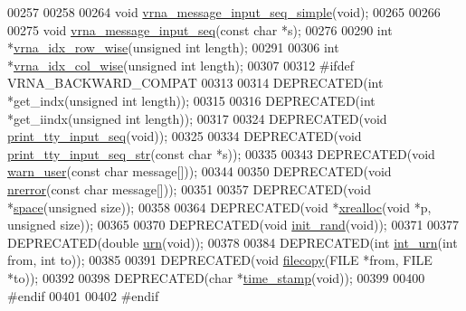 \begin{DoxyCode}
00257 
00258 
00264 \textcolor{keywordtype}{void} \hyperlink{group__utils_gaee1dd652ca5b9e56b096963a1576f73b}{vrna\_message\_input\_seq\_simple}(\textcolor{keywordtype}{void});
00265 
00266 
00275 \textcolor{keywordtype}{void} \hyperlink{group__utils_gaf4d194d558b0c975f269de01dea52460}{vrna\_message\_input\_seq}(\textcolor{keyword}{const} \textcolor{keywordtype}{char} *s);
00276 
00290 \textcolor{keywordtype}{int} *\hyperlink{group__utils_ga70b180e9ea764218a82647a1cd347445}{vrna\_idx\_row\_wise}(\textcolor{keywordtype}{unsigned} \textcolor{keywordtype}{int} length);
00291 
00306 \textcolor{keywordtype}{int} *\hyperlink{group__utils_ga89ebc69c52fa0c78c9e1974b0017746b}{vrna\_idx\_col\_wise}(\textcolor{keywordtype}{unsigned} \textcolor{keywordtype}{int} length);
00307 
00312 \textcolor{preprocessor}{#ifdef  VRNA\_BACKWARD\_COMPAT}
00313 
00314 DEPRECATED(\textcolor{keywordtype}{int}   *get\_indx(\textcolor{keywordtype}{unsigned} \textcolor{keywordtype}{int} length));
00315 
00316 DEPRECATED(\textcolor{keywordtype}{int}   *get\_iindx(\textcolor{keywordtype}{unsigned} \textcolor{keywordtype}{int} length));
00317 
00324 DEPRECATED(\textcolor{keywordtype}{void} \hyperlink{utils_8h_a6bf778117d31b7fd90db435323f4ef74}{print\_tty\_input\_seq}(\textcolor{keywordtype}{void}));
00325 
00334 DEPRECATED(\textcolor{keywordtype}{void} \hyperlink{utils_8h_ae4ef89b662a3e9b5b5f0781d9757aba0}{print\_tty\_input\_seq\_str}(\textcolor{keyword}{const} \textcolor{keywordtype}{char} *s));
00335 
00343 DEPRECATED(\textcolor{keywordtype}{void} \hyperlink{utils_8h_af2355fa8746f2f30fbe71db65dea3d51}{warn\_user}(\textcolor{keyword}{const} \textcolor{keywordtype}{char} message[]));
00344 
00350 DEPRECATED(\textcolor{keywordtype}{void} \hyperlink{utils_8h_a127ce946e56b5a5773781cabe68e38c5}{nrerror}(\textcolor{keyword}{const} \textcolor{keywordtype}{char} message[]));
00351 
00357 DEPRECATED(\textcolor{keywordtype}{void} *\hyperlink{utils_8h_ad7e1e137b3bf1f7108933d302a7f0177}{space}(\textcolor{keywordtype}{unsigned} size));
00358 
00364 DEPRECATED(\textcolor{keywordtype}{void} *\hyperlink{utils_8h_a9037ada838835b1b9db41581a021b0c8}{xrealloc}(\textcolor{keywordtype}{void} *p, \textcolor{keywordtype}{unsigned} size));
00365 
00370 DEPRECATED(\textcolor{keywordtype}{void} \hyperlink{utils_8h_a8aaa6d9be6f803f496d9b97375c371f3}{init\_rand}(\textcolor{keywordtype}{void}));
00371 
00377 DEPRECATED(\textcolor{keywordtype}{double} \hyperlink{utils_8h_aaa328491c84996e445d027fde9800f2e}{urn}(\textcolor{keywordtype}{void}));
00378 
00384 DEPRECATED(\textcolor{keywordtype}{int} \hyperlink{utils_8h_a68ff0849d44f62fe491800378a5ffcb4}{int\_urn}(\textcolor{keywordtype}{int} from, \textcolor{keywordtype}{int} to));
00385 
00391 DEPRECATED(\textcolor{keywordtype}{void} \hyperlink{utils_8h_ab213334ce977b6d21611cdea6b80c3bf}{filecopy}(FILE *from, FILE *to));
00392 
00398 DEPRECATED(\textcolor{keywordtype}{char} *\hyperlink{utils_8h_a7afeb906cb36e9d77379eabc6907ac46}{time\_stamp}(\textcolor{keywordtype}{void}));
00399 
00400 \textcolor{preprocessor}{#endif}
00401 
00402 \textcolor{preprocessor}{#endif}
\end{DoxyCode}
